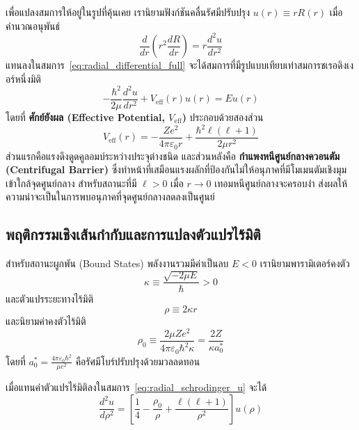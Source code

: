 เพื่อแปลงสมการให้อยู่ในรูปที่คุ้นเคย เรานิยามฟังก์ชันคลื่นรัศมีปรับปรุง $u(r) \equiv r R(r)$ เมื่อคำนวณอนุพันธ์
\begin{equation}
\frac{d}{dr}\left( r^2 \frac{dR}{dr} \right) = r \frac{d^2 u}{dr^2}
\end{equation}
แทนลงในสมการ~\eqref{eq:radial_differential_full} จะได้สมการที่มีรูปแบบเทียบเท่าสมการชเรอดิงเงอร์หนึ่งมิติ
\begin{equation}
-\frac{\hbar^2}{2\mu} \frac{d^2 u}{dr^2} + V_{\text{eff}}(r) u(r) = E u(r)
\label{eq:radial_schrodinger_u}
\end{equation}
โดยที่ \textbf{ศักย์ยังผล (Effective Potential, $V_{\text{eff}}$)} ประกอบด้วยสองส่วน
\begin{equation}
V_{\text{eff}}(r) = -\frac{Ze^2}{4\pi\varepsilon_0 r} + \frac{\hbar^2 \ell(\ell + 1)}{2\mu r^2}
\label{eq:effective_potential_def}
\end{equation}
ส่วนแรกคือแรงดึงดูดคูลอมบ์ระหว่างประจุต่างชนิด และส่วนหลังคือ \textbf{กำแพงหนีศูนย์กลางควอนตัม (Centrifugal Barrier)} ซึ่งทำหน้าที่เสมือนแรงผลักที่ป้องกันไม่ให้อนุภาคที่มีโมเมนตัมเชิงมุมเข้าใกล้จุดศูนย์กลาง สำหรับสถานะที่มี $\ell > 0$ เมื่อ $r \to 0$ เทอมหนีศูนย์กลางจะครอบงำ ส่งผลให้ความน่าจะเป็นในการพบอนุภาคที่จุดศูนย์กลางลดลงเป็นศูนย์

\subsection{พฤติกรรมเชิงเส้นกำกับและการแปลงตัวแปรไร้มิติ}
สำหรับสถานะผูกพัน (Bound States) พลังงานรวมมีค่าเป็นลบ $E < 0$ เรานิยามพารามิเตอร์คงตัว
\begin{equation}
\kappa \equiv \frac{\sqrt{-2\mu E}}{\hbar} > 0
\end{equation}
และตัวแปรระยะทางไร้มิติ
\begin{equation}
\rho \equiv 2\kappa r
\end{equation}
และนิยามค่าคงตัวไร้มิติ
\begin{equation}
\rho_0 \equiv \frac{2\mu Z e^2}{4\pi\varepsilon_0 \hbar^2 \kappa} = \frac{2 Z}{\kappa a_0^*}
\end{equation}
โดยที่ $a_0^* = \frac{4\pi\varepsilon_0 \hbar^2}{\mu e^2}$ คือรัศมีโบร์ปรับปรุงด้วยมวลลดทอน

เมื่อแทนค่าตัวแปรไร้มิติลงในสมการ~\eqref{eq:radial_schrodinger_u} จะได้
\begin{equation}
\frac{d^2 u}{d\rho^2} = \left[ \frac{1}{4} - \frac{\rho_0}{\rho} + \frac{\ell(\ell + 1)}{\rho^2} \right] u(\rho)
\label{eq:dimensionless_radial_eq}
\end{equation}

